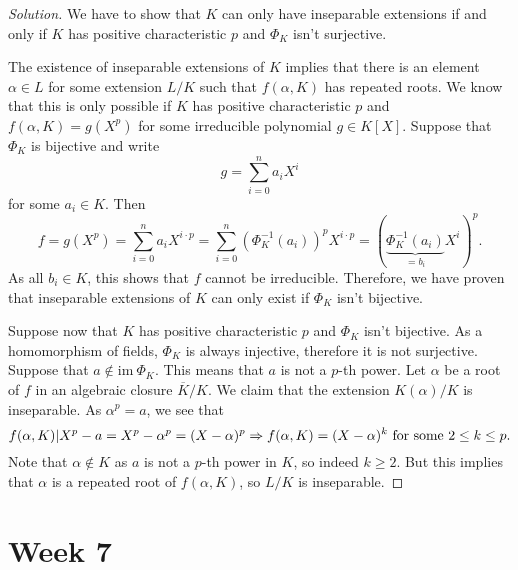 \documentclass[a4paper,10pt,reqno]{amsart}
\newenvironment{sol}
  {\renewcommand\qedsymbol{$\blacksquare$}\begin{proof}[Solution]}
  {\end{proof}}
\begin{document}
\begin{sol}
We have to show that $K$ can only have inseparable extensions if and only if $K$ has positive characteristic $p$ and $\Phi_K$ isn't surjective.

The existence of inseparable extensions of $K$ implies that there is an element $\alpha \in L$ for some extension $L/K$ such that $f(\alpha,K)$ has repeated roots. We know that this is only possible if $K$ has positive characteristic $p$ and $f(\alpha,K) = g(X^p)$ for some irreducible polynomial $g \in K[X]$. Suppose that $\Phi_K$ is bijective and write
\[
g = \sum_{i=0}^n a_iX^i
\]
for some $a_i \in K$. Then
\[
f = g(X^p) = \sum_{i=0}^n a_iX^{i\cdot p} = \sum_{i=0}^n (\Phi_K^{-1}(a_i))^pX^{i\cdot p} = \left( \underbrace{\Phi_K^{-1}(a_i)}_{=b_i}X^i \right)^p.
\]
As all $b_i \in K$, this shows that $f$ cannot be irreducible. Therefore, we have proven that inseparable extensions of $K$ can only exist if $\Phi_K$ isn't bijective.

Suppose now that $K$ has positive characteristic $p$ and $\Phi_K$ isn't bijective. As a homomorphism of fields, $\Phi_K$ is always injective, therefore it is not surjective. Suppose that $a \not\in \mathrm{im}\ \Phi_K$. This means that $a$ is not a $p$-th power. Let $\alpha$ be a root of $f$ in an algebraic closure $\overline{K}/K$. We claim that the extension $K(\alpha)/K$ is inseparable. As $\alpha^p = a$, we see that
\[
f(\alpha, K) | X^p - a = X^p - \alpha^p = (X - \alpha)^p \Rightarrow f(\alpha,K) = (X- \alpha)^k \textnormal{ for some } 2 \leq k \leq p.
\]
Note that $\alpha \not\in K$ as $a$ is not a $p$-th power in $K$, so indeed $k \geq 2$. But this implies that $\alpha$ is a repeated root of $f(\alpha,K)$, so $L/K$ is inseparable.
\end{sol}



\newpage

\section{Week 7}
\end{document}
